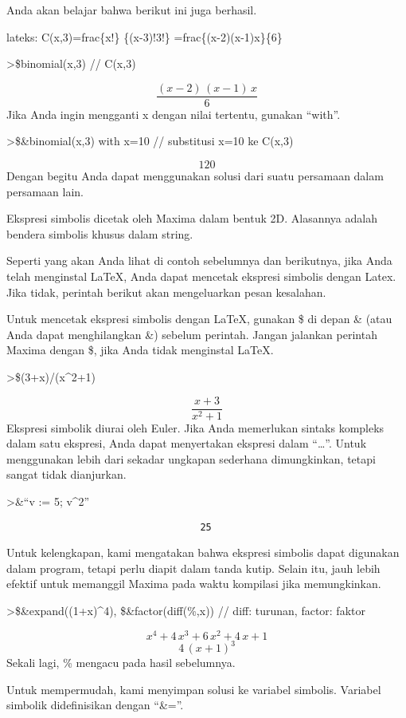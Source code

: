 \documentclass[
]{book}
\begin{document}
Anda akan belajar bahwa berikut ini juga berhasil.

lateks: C(x,3)=frac\{x!\} \{(x-3)!3!\} =frac\{(x-2)(x-1)x\}\{6\}

\textgreater\$binomial(x,3) // C(x,3)

\[\frac{\left(x-2\right)\,\left(x-1\right)\,x}{6}\]Jika Anda ingin mengganti x dengan nilai tertentu, gunakan ``with''.

\textgreater\$\&binomial(x,3) with x=10 // substitusi x=10 ke C(x,3)

\[120\]Dengan begitu Anda dapat menggunakan solusi dari suatu persamaan dalam persamaan lain.

Ekspresi simbolis dicetak oleh Maxima dalam bentuk 2D. Alasannya adalah bendera simbolis khusus dalam string.

Seperti yang akan Anda lihat di contoh sebelumnya dan berikutnya, jika Anda telah menginstal LaTeX, Anda dapat mencetak ekspresi simbolis dengan Latex. Jika tidak, perintah berikut akan mengeluarkan pesan kesalahan.

Untuk mencetak ekspresi simbolis dengan LaTeX, gunakan \$ di depan \& (atau Anda dapat menghilangkan \&) sebelum perintah. Jangan jalankan perintah Maxima dengan \$, jika Anda tidak menginstal LaTeX.

\textgreater\$(3+x)/(x\^{}2+1)

\[\frac{x+3}{x^2+1}\]Ekspresi simbolik diurai oleh Euler. Jika Anda memerlukan sintaks kompleks dalam satu ekspresi, Anda dapat menyertakan ekspresi dalam ``\ldots{}''. Untuk menggunakan lebih dari sekadar ungkapan sederhana dimungkinkan, tetapi sangat tidak dianjurkan.

\textgreater\&``v := 5; v\^{}2''

\begin{verbatim}
                                  25
\end{verbatim}

Untuk kelengkapan, kami mengatakan bahwa ekspresi simbolis dapat digunakan dalam program, tetapi perlu diapit dalam tanda kutip. Selain itu, jauh lebih efektif untuk memanggil Maxima pada waktu kompilasi jika memungkinkan.

\textgreater\$\&expand((1+x)\^{}4), \$\&factor(diff(\%,x)) // diff: turunan, factor: faktor

\[x^4+4\,x^3+6\,x^2+4\,x+1\] \[4\,\left(x+1\right)^3\]Sekali lagi, \% mengacu pada hasil sebelumnya.

Untuk mempermudah, kami menyimpan solusi ke variabel simbolis. Variabel simbolik didefinisikan dengan ``\&=''.
\end{document}
